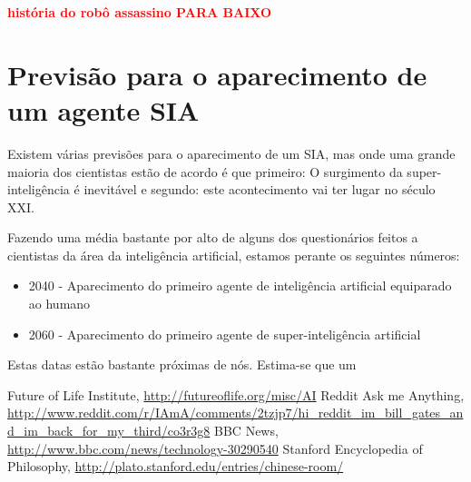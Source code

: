 \documentclass[runningheads,a4paper]{llncs}
\begin{document}
\textcolor{red}{\textbf{história do robô assassino PARA BAIXO}}

\section{Previsão para o aparecimento de um agente SIA}

Existem várias previsões para o aparecimento de um SIA, mas onde uma grande maioria dos cientistas estão de acordo é que primeiro: O surgimento da super-inteligência é inevitável e segundo: este acontecimento vai ter lugar no século XXI\@.

Fazendo uma média bastante por alto de alguns dos questionários feitos a cientistas da área da inteligência artificial, estamos perante os seguintes números:

\begin{itemize}

  \item 2040 - Aparecimento do primeiro agente de inteligência artificial equiparado ao humano
  \item 2060 - Aparecimento do primeiro agente de super-inteligência artificial

\end{itemize}

Estas datas estão bastante próximas de nós. Estima-se que um

\begin{thebibliography}{4}

   Future of Life Institute, \url{http://futureoflife.org/misc/AI}
   Reddit Ask me Anything, \url{http://www.reddit.com/r/IAmA/comments/2tzjp7/hi_reddit_im_bill_gates_and_im_back_for_my_third/co3r3g8}
   BBC News, \url{http://www.bbc.com/news/technology-30290540}
   Stanford Encyclopedia of Philosophy, \url{http://plato.stanford.edu/entries/chinese-room/}

\end{thebibliography}
\end{document}
